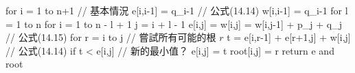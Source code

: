 \startCLRSCODE
{}

for i = 1 to n+1		// 基本情況
	e[i,i-1] = q_{i-1}	// 公式(14.14)
	w[i,i-1] = q_{i-1}
for l = 1 to n
	for i = 1 to n - l + 1
		j = i + l - 1
		e[i,j] = \infty
		w[i,j] = w[i,j-1] + p_j + q_j	// 公式(14.15)
		for r = i to j			// 嘗試所有可能的根 $r$
			t = e[i,r-1] + e[r+1,j] + w[i,j]	// 公式(14.14)
			if t < e[i,j]		// 新的最小值？
				e[i,j] = t
				root[i,j] = r
return e and root
\stopCLRSCODE
